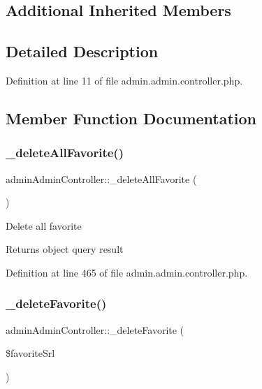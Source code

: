 \subsection*{Additional Inherited Members}


\subsection{Detailed Description}


Definition at line 11 of file admin.\+admin.\+controller.\+php.



\subsection{Member Function Documentation}
\mbox{\label{classadminAdminController_af03754d231177ae0326f0cc262dd6dd7}} 
\subsubsection{\texorpdfstring{\+\_\+delete\+All\+Favorite()}{\_deleteAllFavorite()}}
{\footnotesize\ttfamily admin\+Admin\+Controller\+::\+\_\+delete\+All\+Favorite (\begin{DoxyParamCaption}{ }\end{DoxyParamCaption})}

Delete all favorite \begin{DoxyReturn}{Returns}
object query result 
\end{DoxyReturn}


Definition at line 465 of file admin.\+admin.\+controller.\+php.

\mbox{\label{classadminAdminController_aeaf185ff2307ca6fcccaf1589b25bc6f}} 
\subsubsection{\texorpdfstring{\+\_\+delete\+Favorite()}{\_deleteFavorite()}}
{\footnotesize\ttfamily admin\+Admin\+Controller\+::\+\_\+delete\+Favorite (\begin{DoxyParamCaption}\item[{}]{\$favorite\+Srl }\end{DoxyParamCaption})}

